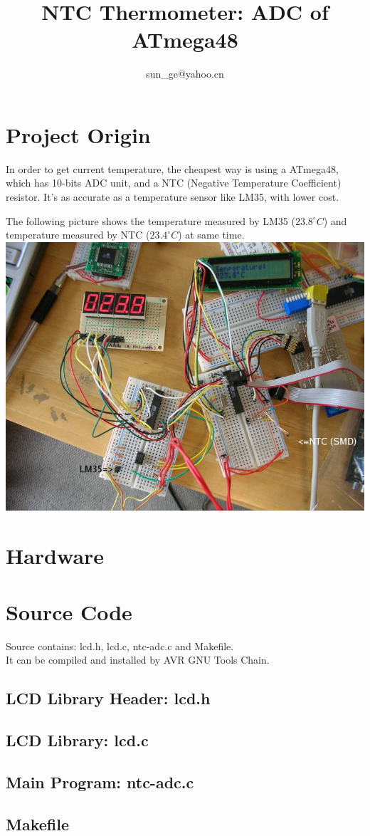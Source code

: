 \documentclass[11pt,a4paper]{article}
\title{NTC Thermometer: ADC of ATmega48}
\author{sun\_ge@yahoo.cn}
\begin{document}
\maketitle


\section{Project Origin}
In order to get current temperature, the cheapest way is using a ATmega48, which has 10-bits ADC unit,
and a NTC (Negative Temperature Coefficient) resistor. It's as accurate as a temperature sensor like
LM35, with lower cost.\\

\begin{center}
The following picture shows the temperature measured by LM35 ($23.8^\circ C$) and 
temperature measured by NTC ($23.4^\circ C$) at same time. 
\includegraphics[scale=0.8]{adc-cmp.jpg}
\end{center}

\section{Hardware}


\section{Source Code}
Source contains: lcd.h, lcd.c, ntc-adc.c and Makefile.\\
It can be compiled and installed by AVR GNU Tools Chain.

\subsection{LCD Library Header: lcd.h}


\subsection{LCD Library: lcd.c}


\subsection{Main Program: ntc-adc.c}


\subsection{Makefile}

\end{document}

